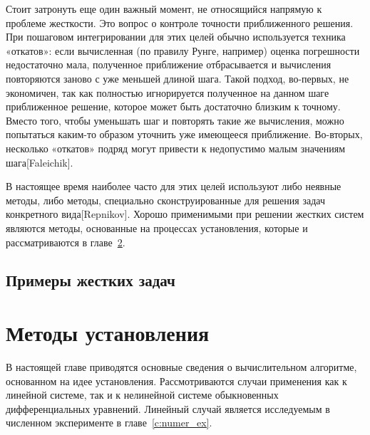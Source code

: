 \documentclass[a4paper,12pt]{report}
\begin{document}
 
 Стоит затронуть еще один важный момент, не относящийся напрямую к проблеме жесткости. Это вопрос о контроле точности приближенного решения. При пошаговом интегрировании
для этих целей обычно используется техника «откатов»: если вычисленная (по правилу Рунге,
например) оценка погрешности недостаточно мала, полученное приближение отбрасывается и
вычисления повторяются заново с уже меньшей длиной шага. Такой подход, во-первых, не экономичен, так как полностью игнорируется полученное на данном шаге приближенное решение,
которое может быть достаточно близким к точному. Вместо того, чтобы уменьшать шаг и повторять такие же вычисления, можно попытаться каким-то образом уточнить уже имеющееся
приближение. Во-вторых, несколько «откатов» подряд могут привести к недопустимо малым
значениям шага[Faleichik].

В настоящее время наиболее часто для этих целей используют либо неявные методы, либо методы, специально сконструированные для решения задач конкретного вида[Repnikov]. Хорошо применимыми при решении жестких систем являются методы, основанные на процессах установления, которые и рассматриваются в главе~\ref{c:stead_methods}. 



  
  \section{Примеры жестких задач}
  \label{s:stiff_examples}   
  

  \chapter{Методы установления}
  \label{c:stead_methods}
  В настоящей главе приводятся основные сведения о вычислительном алгоритме, основанном на идее установления. Рассмотриваются случаи применения как к линейной системе, так и к нелинейной системе обыкновенных дифференциальных уравнений. Линейный случай является исследуемым в численном эксперименте в главе~\ref{c:numer_ex}.
  
\end{document}
